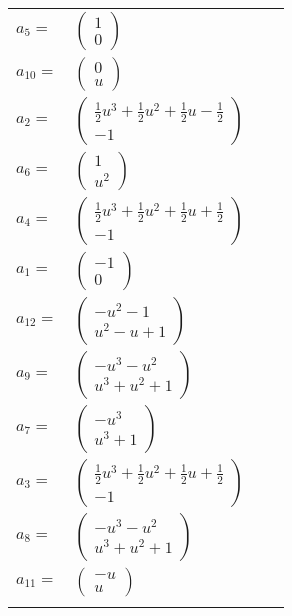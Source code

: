 \documentclass[1p]{elsarticle_modified}
\theoremstyle{definition}
\begin{document}
\begin{tabular}{m{7pt} m{180pt} m{7pt} m{180pt} }
\flushright $a_{5}=$&$\begin{pmatrix}1\\0\end{pmatrix}$ \\
\flushright $a_{10}=$&$\begin{pmatrix}0\\u\end{pmatrix}$ \\
\flushright $a_{2}=$&$\begin{pmatrix}\frac{1}{2} u^3+\frac{1}{2} u^2+\frac{1}{2} u-\frac{1}{2}\\-1\end{pmatrix}$ \\
\flushright $a_{6}=$&$\begin{pmatrix}1\\u^2\end{pmatrix}$ \\
\flushright $a_{4}=$&$\begin{pmatrix}\frac{1}{2} u^3+\frac{1}{2} u^2+\frac{1}{2} u+\frac{1}{2}\\-1\end{pmatrix}$ \\
\flushright $a_{1}=$&$\begin{pmatrix}-1\\0\end{pmatrix}$ \\
\flushright $a_{12}=$&$\begin{pmatrix}- u^2-1\\u^2- u+1\end{pmatrix}$ \\
\flushright $a_{9}=$&$\begin{pmatrix}- u^3- u^2\\u^3+u^2+1\end{pmatrix}$ \\
\flushright $a_{7}=$&$\begin{pmatrix}- u^3\\u^3+1\end{pmatrix}$ \\
\flushright $a_{3}=$&$\begin{pmatrix}\frac{1}{2} u^3+\frac{1}{2} u^2+\frac{1}{2} u+\frac{1}{2}\\-1\end{pmatrix}$ \\
\flushright $a_{8}=$&$\begin{pmatrix}- u^3- u^2\\u^3+u^2+1\end{pmatrix}$ \\
\flushright $a_{11}=$&$\begin{pmatrix}- u\\u\end{pmatrix}$\\&\end{tabular}
\end{document}
